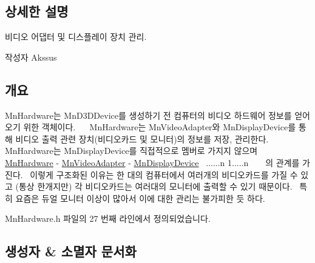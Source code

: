 \subsection{상세한 설명}
비디오 어댑터 및 디스플레이 장치 관리. 

\begin{DoxyAuthor}{작성자}
Akssus 
\end{DoxyAuthor}
\hypertarget{class_m_n_l_1_1_mn_video_adapter_개요}{}\subsection{개요}\label{class_m_n_l_1_1_mn_video_adapter_개요}
Mn\+Hardware는 Mn\+D3\+D\+Device를 생성하기 전 컴퓨터의 비디오 하드웨어 정보를 얻어오기 위한 객체이다.~\newline
~\newline
Mn\+Hardware는 Mn\+Video\+Adapter와 Mn\+Display\+Device를 통해 비디오 출력 관련 장치(비디오카드 및 모니터)의 정보를 저장, 관리한다.~\newline
~\newline
Mn\+Hardware는 Mn\+Display\+Device를 직접적으로 멤버로 가지지 않으며~\newline
~\newline
\hyperlink{class_m_n_l_1_1_mn_hardware}{Mn\+Hardware} -\/ \hyperlink{class_m_n_l_1_1_mn_video_adapter}{Mn\+Video\+Adapter} -\/ \hyperlink{class_m_n_l_1_1_mn_display_device}{Mn\+Display\+Device} ~......n 1.....n ~\newline
~\newline
의 관계를 가진다.~\newline
이렇게 구조화된 이유는 한 대의 컴퓨터에서 여러개의 비디오카드를 가질 수 있고 (통상 한개지만) 각 비디오카드는 여러대의 모니터에 출력할 수 있기 때문이다.~\newline
특히 요즘은 듀얼 모니터 이상이 많아서 이에 대한 관리는 불가피한 듯 하다. 

Mn\+Hardware.\+h 파일의 27 번째 라인에서 정의되었습니다.



\subsection{생성자 \& 소멸자 문서화}
\mbox{\label{class_m_n_l_1_1_mn_hardware_ad9270be0bcce91bf3a21b6cac432e713}} 
